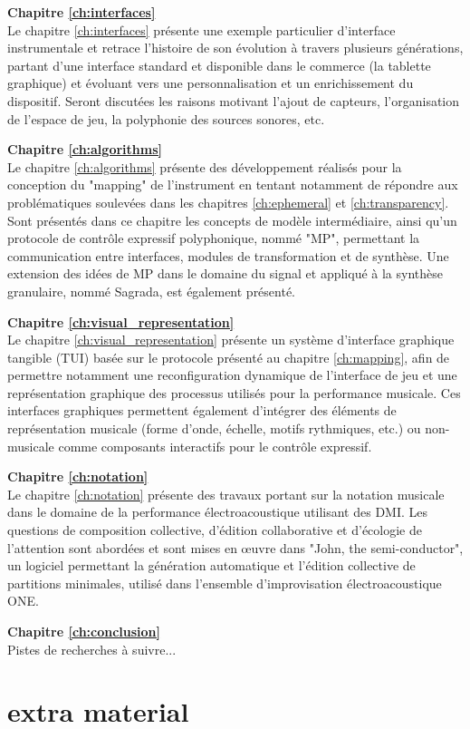 \textbf{Chapitre \ref{ch:interfaces}} \\[0.2em]
Le chapitre \ref{ch:interfaces} présente une exemple particulier d'interface instrumentale et retrace l'histoire de son évolution à travers plusieurs générations, partant d'une interface standard et disponible dans le commerce (la tablette graphique) et évoluant vers une personnalisation et un enrichissement du dispositif. 
Seront discutées les raisons motivant l'ajout de capteurs, l'organisation de l'espace de jeu, la polyphonie des sources sonores, etc.

\textbf{Chapitre \ref{ch:algorithms}} \\[0.2em]
Le chapitre \ref{ch:algorithms} présente des développement réalisés pour la conception du "mapping" de l'instrument en tentant notamment de répondre aux problématiques soulevées dans les chapitres \ref{ch:ephemeral} et \ref{ch:transparency}. Sont présentés dans ce chapitre les concepts de modèle intermédiaire, ainsi qu'un protocole de contrôle expressif polyphonique, nommé "MP", permettant la communication entre interfaces, modules de transformation et de synthèse. Une extension des idées de MP dans le domaine du signal et appliqué à la synthèse granulaire, nommé Sagrada, est également présenté.

\textbf{Chapitre \ref{ch:visual_representation}} \\[0.2em]
Le chapitre \ref{ch:visual_representation} présente un système d'interface graphique tangible (TUI) basée sur le protocole présenté au chapitre  \ref{ch:mapping}, afin de permettre notamment une reconfiguration dynamique de l'interface de jeu et une représentation graphique des processus utilisés pour la performance musicale. Ces interfaces graphiques permettent également d'intégrer des éléments de représentation musicale (forme d'onde, échelle, motifs rythmiques, etc.) ou non-musicale comme composants interactifs pour le contrôle expressif.

\textbf{Chapitre \ref{ch:notation}} \\[0.2em]
Le chapitre \ref{ch:notation} présente des travaux portant sur la notation musicale dans le domaine de la performance électroacoustique utilisant des DMI. Les questions de composition collective, d'édition collaborative et d'écologie de l'attention sont abordées et sont mises en œuvre dans "John, the semi-conductor", un logiciel permettant la génération automatique et l'édition collective de partitions minimales, utilisé dans l'ensemble d'improvisation électroacoustique ONE. 

\textbf{Chapitre \ref{ch:conclusion}} \\[0.2em]
Pistes de recherches à suivre...


\section*{extra material}
